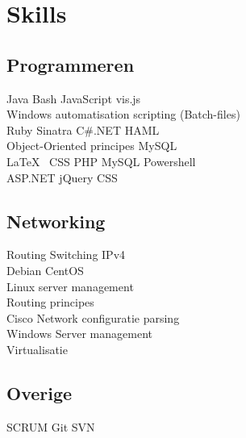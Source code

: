 \documentclass[a4paper]{deedy-resume} %
\begin{document}
\begin{minipage}[t]{0.33\textwidth} %


\section{Skills}

\subsection{Programmeren}

Java \textbullet{} Bash \textbullet{} JavaScript\textbullet{} vis.js \\ Windows automatisation scripting (Batch-files) \\ 
Ruby \textbullet{} Sinatra \textbullet{} C\#.NET  \textbullet{} HAML \\ Object-Oriented principes \textbullet{} MySQL \\

\vspace{\topsep} %
\LaTeX\ \textbullet{} CSS \textbullet{} PHP \textbullet{} MySQL \textbullet{} Powershell \\
ASP.NET \textbullet{} jQuery \textbullet CSS 

\sectionspace %

\subsection{Networking}

Routing \textbullet{} Switching \textbullet{} IPv4 \\ 
Debian \textbullet{} CentOS \\ Linux server management \\ Routing principes \\ Cisco \textbullet{} Network configuratie parsing \\ Windows Server management \\ Virtualisatie

\sectionspace %

\subsection{Overige}
SCRUM \textbullet{} Git \textbullet{} SVN \\


\end{minipage}
\end{document}

